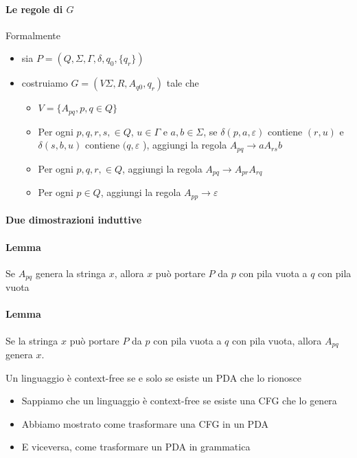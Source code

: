 \paragraph{Le regole di $G$}
Formalmente 
\begin{itemize}
	\item sia $P=(Q,\Sigma,\Gamma, \delta, q_0,\{q_r\})$ 
	\item costruiamo $G=(V\Sigma, R, A_{q0}, q_r)$ tale che 
		\begin{itemize}
			\item $V =\{A_{pq}, p, q\in Q \}$
			\item Per ogni $p,q,r,s,\in Q$, $u\in\Gamma$ e $a,b\in\Sigma$, se $\delta(p,a,\varepsilon)$ contiene $(r,u)$ e $\delta(s,b,u)$ contiene $(q,\varepsilon$ ), aggiungi la regola $A_{pq}\rightarrow aA_{rs}b$ 
			\item Per ogni $p,q,r,\in Q$, aggiungi la regola $A_{pq}\rightarrow A_{pr}A_{rq}$ 
			\item Per ogni $p\in Q$, aggiungi la regola $A_{pp}\rightarrow \varepsilon$ 
		\end{itemize}
\end{itemize}

\paragraph{Due dimostrazioni induttive}
\paragraph{Lemma}
Se $A_{pq}$ genera la stringa $x$, allora $x$ può portare $P$ da $p$ con pila vuota a $q$ con pila vuota
\paragraph{Lemma}
Se la stringa $x$ può portare $P$ da $p$ con pila vuota a $q$ con pila vuota, allora $A_{pq}$ genera $x$. 

\begin{theorem}
	Un linguaggio è context-free se e solo se esiste un PDA che lo rionosce 
\end{theorem}
\begin{itemize}
	\item Sappiamo che un linguaggio è context-free se esiste una CFG che lo genera
	\item Abbiamo mostrato come trasformare una CFG in un PDA
	\item E viceversa, come trasformare un PDA in grammatica
\end{itemize}



